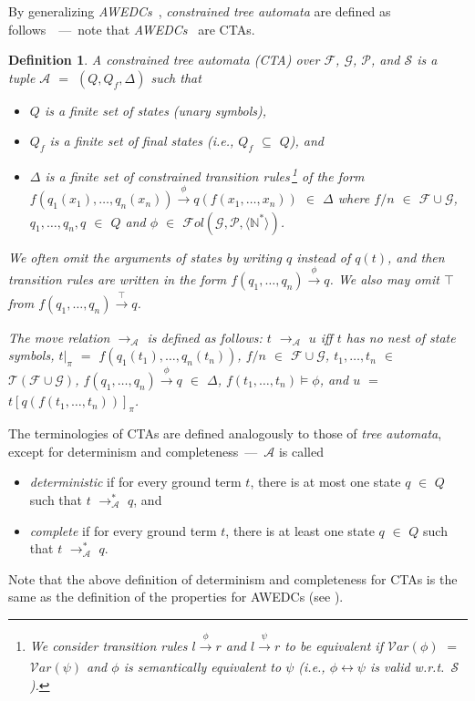 \documentclass[copyright,creativecommons]{eptcs}
\newtheorem{definition}{Definition}
\newcommand{\cA}{\mathcal{A}}
\newcommand{\cF}{\mathcal{F}}
\newcommand{\cG}{\mathcal{G}}
\newcommand{\cP}{\mathcal{P}}
\newcommand{\cS}{\mathcal{S}}
\newcommand{\Var}{{\mathcal{V}ar}}
\newcommand{\posvar}[1]{{\langle}#1{\rangle}}
\newcommand{\Terms}{{\mathcal{T}}}
\newcommand{\Fol}{{\mathcal{F}\!\mathit{ol}}}
\renewcommand{\equiv}{=}
\begin{document}
By generalizing \emph{AWEDCs}~\cite{TATA}, \emph{constrained tree
automata} are defined as follows~\cite{CTA}~---~note that
\emph{AWEDCs}~\cite{TATA} are CTAs.
\begin{definition}A \emph{constrained tree automata} (CTA) over $\cF$,
 $\cG$, $\cP$, and $\cS$ is a tuple $\cA$ $=$ $(Q,Q_f,\Delta)$ such that
\begin{itemize}
  \item $Q$ is a finite set of \emph{states} (unary symbols), 
  \item $Q_f$ is a finite set of \emph{final} states (i.e., $Q_f$
	$\subseteq$ $Q$), and 
  \item $\Delta$ is a finite set of \emph{constrained transition
	rules}\,\footnote{ We consider transition rules $l \xrightarrow[]{\phi} r$ and
 $l \xrightarrow[]{\psi} r$ to be equivalent if $\Var(\phi)$ $=$
 $\Var(\psi)$ and $\phi$ is semantically equivalent to $\psi$ (i.e.,
 $\phi \leftrightarrow \psi$ is valid w.r.t.\ $\cS$).}
 of the form
 $f(q_1(x_1),\ldots,q_n(x_n)) \xrightarrow[]{\phi} q(f(x_1,\ldots,x_n))$
 $\in$ $\Delta$ where $f/n$ $\in$ 
 $\cF\cup\cG$, $q_1,\ldots,q_n,q$ $\in$ $Q$ and $\phi$ $\in$
 $\Fol(\cG,\cP,\posvar{\mathbb{N}^*})$.  
 \end{itemize}
 We often omit the arguments of states by writing $q$ instead of
 $q(t)$, and then transition rules are written in the form
 $f(q_1,\ldots,q_n) \xrightarrow[]{\phi} q$. 
 We also may omit $\top$ from $f(q_1,\ldots,q_n)  \xrightarrow[]{\top}
 q$. 

The \emph{move relation} $\to_\cA$ is defined as follows:
$t$ $\to_\cA$ $u$ iff $t$ has no nest of state symbols,  $t|_\pi$
 $\equiv$ $f(q_1(t_1),\ldots,q_n(t_n))$, $f/n$ $\in$ $\cF\cup\cG$,
 $t_1,\ldots,t_n$ $\in$ $\Terms(\cF\cup\cG)$,  
$f(q_1,\ldots,q_n) \xrightarrow[]{\phi} q$ $\in$
 $\Delta$, $f(t_1,\ldots,t_n) \models \phi$, 
and $u$ $\equiv$ $t[q(f(t_1,\ldots,t_n))]_\pi$.
\end{definition}
The terminologies of CTAs are defined analogously to those of \emph{tree
 automata}, except for determinism and completeness~---~$\cA$ is called
 \begin{itemize}
  \item \emph{deterministic} if for every ground term
       $t$, there is at most one state $q$ $\in$ $Q$ such that $t$
       $\to^*_\cA$ $q$, and
  \item \emph{complete} if for every ground term $t$,
	there is at least one state $q$ $\in$ $Q$ such that $t$
	$\to^*_\cA$ $q$.
 \end{itemize}
Note that the above definition of determinism and completeness for CTAs
is the same as the definition of the properties for AWEDCs (see
\cite{TATA}). 
\end{document}
